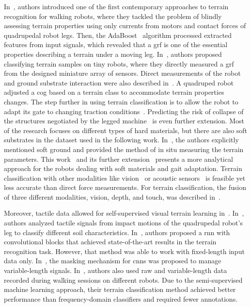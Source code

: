 \documentclass[a4paper, 10pt, twoside]{report}
\begin{document}
In~\cite{Hoepflinger2010}, authors introduced one of the first contemporary approaches to terrain recognition for walking robots, where they tackled the problem of blindly assessing terrain properties using only currents from motors and contact forces of quadrupedal robot legs. Then, the AdaBoost~\cite{adaboost} algorithm processed extracted features from input signals, which revealed that a \acrfull{grf} is one of the essential properties describing a terrain under a moving leg. In~\cite{Wu2016}, authors proposed classifying terrain samples on tiny robots, where they directly measured a \acrshort{grf} from the designed miniature array of sensors. Direct measurements of the robot and ground substrate interaction were also described in~\cite{Li2017a}. A quadruped robot adjusted a \acrfull{cog} based on a terrain class to accommodate terrain properties changes. The step further in using terrain classification is to allow the robot to adapt its gate to changing traction conditions~\cite{Wu2020}. Predicting the risk of collapse of the structures negotiated by the legged machine~\cite{Tennakoon2020} is even further extension. Most of the research focuses on different types of hard materials, but there are also soft substrates in the dataset used in the following work. In~\cite{Bosworth2016}, the authors explicitly mentioned soft ground and provided the method of in situ measuring the terrain parameters. This work~\cite{Fahmi2021} and its further extension~\cite{Fahmi2020} presents a more analytical approach for the robots dealing with soft materials and gait adaptation. Terrain classification with other modalities like vision~\cite{Filitchkin2012} or acoustic sensors~\cite{Christie2016} is feasible yet less accurate than direct force measurements. For terrain classification, the fusion of three different modalities, vision, depth, and touch, was described in~\cite{Walas15a}.

Moreover, tactile data allowed for self-supervised visual terrain learning in~\cite{Wellhausen2019}. In~\cite{kolvenbach19}, authors analyzed tactile signals from impact motions of the quadrupedal robot's leg to classify different soil characteristics. In~\cite{bednarek19}, authors proposed a \acrshort{rnn} with convolutional blocks that achieved state-of-the-art results in the terrain recognition task. However, that method was able to work with fixed-length input data only. In~\cite{bednarek2019icra}, the masking mechanism for \acrshort{cnn}s was proposed to manage variable-length signals. In~\cite{Ahmadi2021}, authors also used raw and variable-length data recorded during walking sessions on different robots. Due to the semi-supervised machine learning approach, their terrain classification method achieved better performance than frequency-domain classifiers and required fewer annotations.
\end{document}
